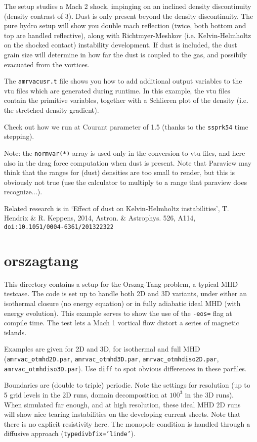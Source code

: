 \documentclass[10pt]{article}
\begin{document}
The setup studies a Mach 2 shock, impinging on an inclined density discontinuity (density contrast of 3). Dust is only present beyond the density discontinuity. The pure hydro setup will show you double mach reflection (twice, both bottom and top are handled reflective), along with Richtmyer-Meshkov (i.e. Kelvin-Helmholtz on the shocked contact) instability development. If dust is included, the dust grain size will determine in how far the dust is coupled to the gas, and possibily evacuated from the vortices.

The {\tt amrvacusr.t} file shows you how to add additional output variables to the vtu files which are generated during runtime. In this example, the vtu files contain the primitive variables, together with a Schlieren plot of the density (i.e. the stretched density gradient).

Check out how we run at Courant parameter of 1.5 (thanks to the {\tt ssprk54} time stepping).

Note: the {\tt normvar(*)} array is used only in the conversion to vtu files, and here also in the drag force computation when dust is present. Note that Paraview may think that the ranges for (dust) densities are too small to render, but this is obviously not true (use the calculator to multiply to a range that paraview does recognize...).

Related research is in `Effect of dust on Kelvin-Helmholtz instabilities', T. Hendrix \& R. Keppens, 2014, Astron. \& Astrophys. 526, A114, {\tt doi:10.1051/0004-6361/201322322}

\section*{orszagtang}

This directory contains a setup for the Orszag-Tang problem, a typical MHD testcase. The code is set up to handle both 2D and 3D variants, under either an isothermal closure (no energy equation) or in fully adiabatic ideal MHD (with energy evolution). This example serves to show the use of the {\tt -eos=} flag at compile time. The test lets a Mach 1 vortical flow distort a series of magnetic islands. 

Examples are given for 2D and 3D, for isothermal and full MHD ({\tt amrvac\_otmhd2D.par}, {\tt amrvac\_otmhd3D.par}, {\tt amrvac\_otmhdiso2D.par}, {\tt amrvac\_otmhdiso3D.par}). Use {\tt diff} to spot obvious differences in these parfiles.

Boundaries are (double to triple) periodic. Note the settings for resolution (up to 5 grid levels in the 2D runs, domain decomposition at $100^3$ in the 3D runs). When simulated far enough, and at high resolution, these ideal MHD 2D runs will show nice tearing instabilities on the developing current sheets. Note that there is no explicit resistivity here. The monopole condition is handled through a diffusive approach ({\tt typedivbfix='linde'}).
\end{document}
